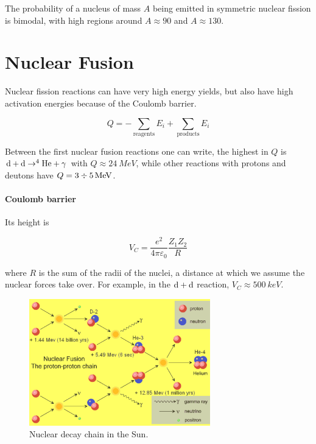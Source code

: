 \documentclass[main.tex]{subfiles}
\begin{document}
The probability of a nucleus of mass \(A\) being emitted in symmetric nuclear fission is bimodal, with high regions around \(A \approx 90\) and \(A \approx 130\).

\section{Nuclear Fusion}

Nuclear fission reactions can have very high energy yields,  but also have high activation energies because of the Coulomb barrier.

\begin{equation}
    Q = - \sum _ \text{reagents} E_i + \sum _{\text{products}} E_i
\end{equation}

Between the first nuclear fusion reactions one can write, the highest in \(Q\) is \(\ce{d}+\ce{d} \rightarrow ^{4} \ce{He} + \gamma\) with \(Q  \approx  \SI{24}{MeV} \), while other reactions with protons and deutons have \(Q = 3 \divisionsymbol \SI{5}{MeV} \).

\paragraph{Coulomb barrier}

Its height is

\begin{equation}
    V_C = \frac{e^2}{4 \pi \varepsilon_0} \frac{Z_1 Z_2}{R}
\end{equation}

where \(R\) is the sum of the radii of the nuclei, a distance at which we assume the nuclear forces take over. For example, in the \(\ce{d} + \ce{d}\) reaction, \(V_C \approx \SI{500}{keV} \).

\begin{figure}[H]
    \centering
    \includegraphics[width=0.7\textwidth]{figures/sun_nuclear_fusion.png}
    \caption{Nuclear decay chain in the Sun.}
    \label{fig:nuclear-fusion-sun}
\end{figure}
\end{document}
